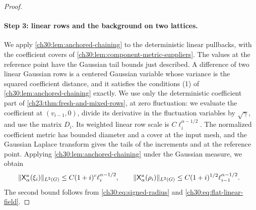 \begin{proof}
\paragraph{Step 3: linear rows and the background on two lattices.} We apply \cref{ch30:lem:anchored-chaining} to the deterministic linear pullbacks, with the coefficient covers of \cref{ch30:lem:component-metric-suppliers}. The values at the reference point have the Gaussian tail bounds just described. A difference of two linear Gaussian rows is a centered Gaussian variable whose variance is the squared coefficient distance, and it satisfies the conditions (1) of \cref{ch30:lem:anchored-chaining} exactly. We use only the deterministic coefficient part of \cref{ch23:thm:fresh-and-mixed-rows}, at zero fluctuation: we evaluate the coefficient at $(v_{i-1},0)$, divide its derivative in the fluctuation variables by $\sqrt\gamma$, and use the matrix $D_i$. Its weighted linear row scale is $C\ell_i^{\alpha-1/2}$. The normalized coefficient metric has bounded diameter and a cover at the input mesh, and the Gaussian Laplace transform gives the tails of the increments and at the reference point. Applying \cref{ch30:lem:anchored-chaining} under the Gaussian measure, we obtain
\begin{equation}\label{ch30:eq:linear-fresh-rough}
 \lVert \mathsf X_\alpha^a(\xi_i)\rVert_{L^2(G)}\le C(1+i)^c\ell_i^{\alpha-1/2},\qquad
 \lVert \mathsf X_\alpha^a(\rho_i)\rVert_{L^2(G)}\le C(1+i)^{1/2}\ell_{i-1}^{\alpha-1/2}.
\end{equation}
The second bound follows from \eqref{ch30:eq:signed-radius} and \eqref{ch30:eq:flat-linear-field}.


\end{proof}
